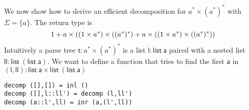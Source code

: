 \begin{example}

We now show how to derive an efficient decomposition for $a^* \times (a^*)^*$ with $\Sigma = \{a\}$. The return type is
\[1 + a \times ((1 \times a^*) \times (({a^*})^*) +  a \times ((1 \times a^*) \times (({a^*})^*) )\]
Intuitively a parse tree $\mathsf{t} : a^* \times (a^*)^*$ is a list $\mathsf{l} : \mathsf{list~a}$ paired with a nested list $\mathsf{ll} : \mathsf{list~(list~a)}$. We want to define a function that tries to find the first $\mathsf{a}$ in $(\mathsf{l},\mathsf{ll}) : \mathsf{list~a} \times \mathsf{list~(list~a)}$
\begin{verbatim}
decomp ([],[]) = inl ()
decomp ([],l::ll') = decomp (l,ll')
decomp (a::l',ll) = inr (a,(l',ll))
\end{verbatim}

\end{example}
